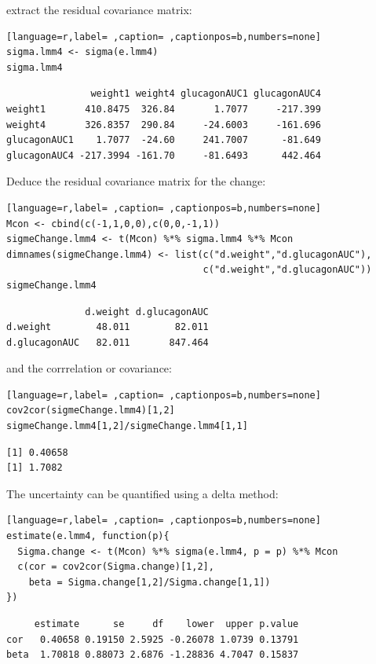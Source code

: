 \documentclass[12pt]{article}
\begin{document}
extract the residual covariance matrix:
\begin{lstlisting}[language=r,label= ,caption= ,captionpos=b,numbers=none]
sigma.lmm4 <- sigma(e.lmm4)
sigma.lmm4
\end{lstlisting}

\begin{verbatim}
               weight1 weight4 glucagonAUC1 glucagonAUC4
weight1       410.8475  326.84       1.7077     -217.399
weight4       326.8357  290.84     -24.6003     -161.696
glucagonAUC1    1.7077  -24.60     241.7007      -81.649
glucagonAUC4 -217.3994 -161.70     -81.6493      442.464
\end{verbatim}


Deduce the residual covariance matrix for the change:
\begin{lstlisting}[language=r,label= ,caption= ,captionpos=b,numbers=none]
Mcon <- cbind(c(-1,1,0,0),c(0,0,-1,1))
sigmeChange.lmm4 <- t(Mcon) %*% sigma.lmm4 %*% Mcon
dimnames(sigmeChange.lmm4) <- list(c("d.weight","d.glucagonAUC"),
                                   c("d.weight","d.glucagonAUC"))
sigmeChange.lmm4
\end{lstlisting}

\begin{verbatim}
              d.weight d.glucagonAUC
d.weight        48.011        82.011
d.glucagonAUC   82.011       847.464
\end{verbatim}


and the corrrelation or covariance:
\begin{lstlisting}[language=r,label= ,caption= ,captionpos=b,numbers=none]
cov2cor(sigmeChange.lmm4)[1,2]
sigmeChange.lmm4[1,2]/sigmeChange.lmm4[1,1]
\end{lstlisting}

\begin{verbatim}
[1] 0.40658
[1] 1.7082
\end{verbatim}


The uncertainty can be quantified using a delta method:
\begin{lstlisting}[language=r,label= ,caption= ,captionpos=b,numbers=none]
estimate(e.lmm4, function(p){
  Sigma.change <- t(Mcon) %*% sigma(e.lmm4, p = p) %*% Mcon
  c(cor = cov2cor(Sigma.change)[1,2],
    beta = Sigma.change[1,2]/Sigma.change[1,1])
})
\end{lstlisting}

\begin{verbatim}
     estimate      se     df    lower  upper p.value
cor   0.40658 0.19150 2.5925 -0.26078 1.0739 0.13791
beta  1.70818 0.88073 2.6876 -1.28836 4.7047 0.15837
\end{verbatim}
\end{document}
